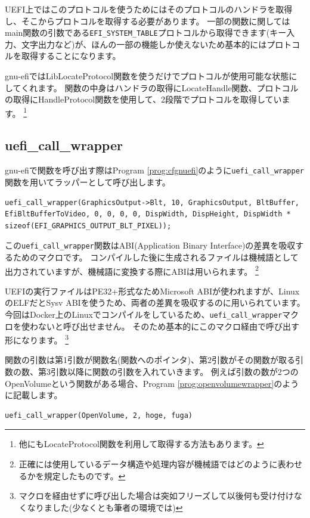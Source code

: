 \documentclass[10pt,b5paper,twoside,openany]{ltjsbook}
\begin{document}
UEFI上ではこのプロトコルを使うためにはそのプロトコルのハンドラを取得し、そこからプロトコルを取得する必要があります。
一部の関数に関してはmain関数の引数である\verb+EFI_SYSTEM_TABLE+プロトコルから取得できます(キー入力、文字出力など)が、ほんの一部の機能しか使えないため基本的にはプロトコルを取得することになります。

gnu-efiではLibLocateProtocol関数を使うだけでプロトコルが使用可能な状態にしてくれます。
関数の中身はハンドラの取得にLocateHandle関数、プロトコルの取得にHandleProtocol関数を使用して、2段階でプロトコルを取得しています。
\footnote{他にもLocateProtocol関数を利用して取得する方法もあります。}

\subsection{uefi\_call\_wrapper}
gnu-efiで関数を呼び出す際はProgram \ref{prog:cfgnuefi}のように\verb+uefi_call_wrapper+関数を用いてラッパーとして呼び出します。
\begin{lstlisting}[style=customC,caption=call function with gnu-efi,label=prog:cfgnuefi]
uefi_call_wrapper(GraphicsOutput->Blt, 10, GraphicsOutput, BltBuffer, EfiBltBufferToVideo, 0, 0, 0, 0, DispWidth, DispHeight, DispWidth * sizeof(EFI_GRAPHICS_OUTPUT_BLT_PIXEL));
\end{lstlisting}
この\verb+uefi_call_wrapper+関数はABI(Application Binary Interface)の差異を吸収するためのマクロです。
コンパイルした後に生成されるファイルは機械語として出力されていますが、機械語に変換する際にABIは用いられます。
\footnote{正確には使用しているデータ構造や処理内容が機械語ではどのように表わせるかを規定したものです。}

UEFIの実行ファイルはPE32+形式なためMicrosoft ABIが使われますが、LinuxのELFだとSysv ABIを使うため、両者の差異を吸収するのに用いられています。
今回はDocker上のLinuxでコンパイルをしているため、\verb+uefi_call_wrapper+マクロを使わないと呼び出せません。
そのため基本的にこのマクロ経由で呼び出す形になります。
\footnote{マクロを経由せずに呼び出した場合は突如フリーズして以後何も受け付けなくなりました(少なくとも筆者の環境では)}

関数の引数は第1引数が関数名(関数へのポインタ)、第2引数がその関数が取る引数の数、第3引数以降に関数の引数を入れていきます。
例えば引数の数が2つのOpenVolumeという関数がある場合、Program \ref{prog:openvolumewrapper}のように記載します。
\begin{lstlisting}[style=customC,caption=OpenVolume with uefi\_call\_wrapper,label=prog:openvolumewrapper]
uefi_call_wrapper(OpenVolume, 2, hoge, fuga)
\end{lstlisting}
\end{document}
